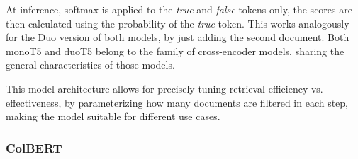 At inference, softmax is applied to the \emph{true} and \emph{false} tokens only, the scores are then calculated using the probability of the \emph{true} token.
This works analogously for the Duo version of both models, by just adding the second document.
Both monoT5 and duoT5  belong to the family of cross-encoder models, sharing the general characteristics of those models.

This model architecture allows for precisely tuning retrieval efficiency vs. effectiveness, by parameterizing how many documents are filtered in each step, making the model suitable for different use cases.


\subsubsection{ColBERT}\label{sec:colbert}

